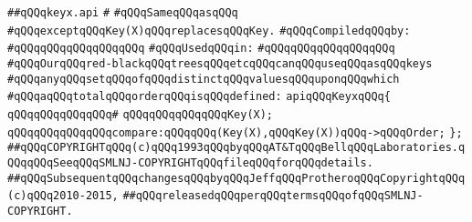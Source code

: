\label{src/lib/src/keyx.api}
\verb|##qQQqkeyx.api|\newline
\verb|#|\newline
\verb|#qQQqSameqQQqasqQQq|\newline
\verb|#qQQqexceptqQQqKey(X)qQQqreplacesqQQqKey.|\newline
\newline
\verb|#qQQqCompiledqQQqby:|\newline
\verb|#qQQqqQQqqQQqqQQqqQQq|\newline
\newline
\verb|#qQQqUsedqQQqin:|\newline
\verb|#qQQqqQQqqQQqqQQqqQQq|\newline
\newline
\newline
\newline
\verb|#qQQqOurqQQqred-blackqQQqtreesqQQqetcqQQqcanqQQquseqQQqasqQQqkeys|\newline
\verb|#qQQqanyqQQqsetqQQqofqQQqdistinctqQQqvaluesqQQquponqQQqwhich|\newline
\verb|#qQQqaqQQqtotalqQQqorderqQQqisqQQqdefined:|\newline
\newline
\newline
\verb|apiqQQqKeyxqQQq{|\newline
\verb|qQQqqQQqqQQqqQQq#|\newline
\verb|qQQqqQQqqQQqqQQqKey(X);|\newline
\verb|qQQqqQQqqQQqqQQqcompare:qQQqqQQq(Key(X),qQQqKey(X))qQQq->qQQqOrder;|\newline
\verb|};|\newline
\newline
\newline
\verb|##qQQqCOPYRIGHTqQQq(c)qQQq1993qQQqbyqQQqAT&TqQQqBellqQQqLaboratories.qQQqqQQqSeeqQQqSMLNJ-COPYRIGHTqQQqfileqQQqforqQQqdetails.|\newline
\verb|##qQQqSubsequentqQQqchangesqQQqbyqQQqJeffqQQqProtheroqQQqCopyrightqQQq(c)qQQq2010-2015,|\newline
\verb|##qQQqreleasedqQQqperqQQqtermsqQQqofqQQqSMLNJ-COPYRIGHT.|\newline

